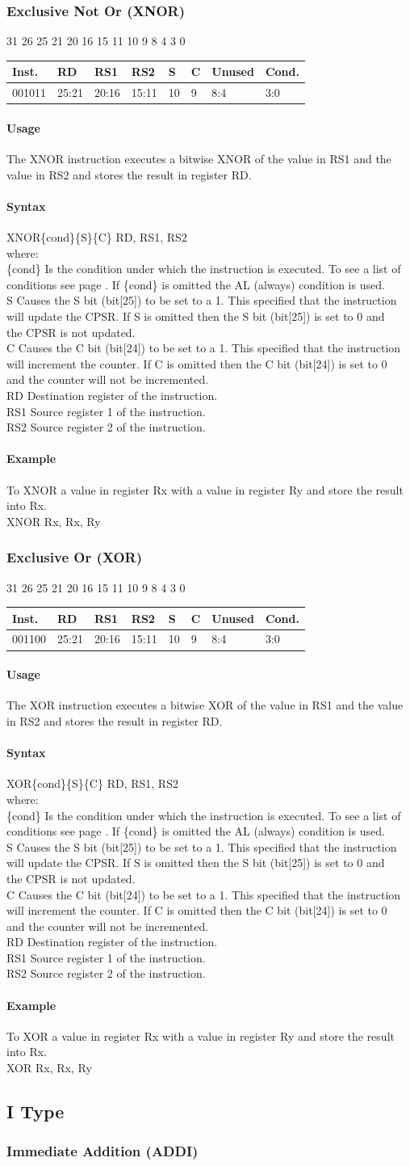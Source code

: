 \documentclass[12pt]{article}
\newcommand{\aTypeInstruction}[5]
{%
    \hspace{1.6cm}31 \hspace{1.15cm}26 \hspace{.04cm}25 \hspace{.8cm}21 \hspace{.04cm}20 \hspace{.8cm}16 \hspace{.04cm}15 \hspace{.8cm}11 \hspace{.04cm}10 \hspace{.275cm}9 \hspace{.275cm}8 \hspace{1.175cm}4 \hspace{.04cm}3 \hspace{1.25cm}0
    \vspace{-.25cm}
    \begin{center}
        \begin{tabular}{ |p{1.8cm}|p{1.5cm}|p{1.5cm}|p{1.5cm}|p{0.3cm}|p{0.3cm}|p{1.5cm}|p{1.5cm}| }
            \hline
            \textbf{Inst.} & \textbf{RD}& \textbf{RS1} & \textbf{RS2} & \textbf{S} & \textbf{C} & Unused & \textbf{Cond.}\\
            \hline
            #1 & 25:21 & 20:16 & 15:11 & 10 & 9 & 8:4 &3:0\\
            \hline
        \end{tabular}
    \end{center}
    
    \noindent
    \paragraph{Usage}
    \begin{flushleft}
    #2\\
    \end{flushleft}
    
    \paragraph{Syntax}
    \begin{flushleft}
    #3\{cond\}\{S\}\{C\} RD, RS1, RS2\\
    \vspace{1em}        %
    where:\\
    \vspace{1em}
    \{cond\}    \hspace{2em} Is the condition under which the instruction is executed. To see a list of\\
                \hspace{5.4em} conditions see page . If \{cond\} is omitted the AL (always) condition is used.\\
    \vspace{1em}    
    S       \hspace{4.5em} Causes the S bit (bit[25]) to be set to a 1. This specified that the instruction\\
            \hspace{5.4em} will update the CPSR. If S is omitted then the S bit (bit[25]) is set to 0 and\\
            \hspace{5.4em} the CPSR is not updated.\\
    \vspace{1em}    
    C       \hspace{4.5em} Causes the C bit (bit[24]) to be set to a 1. This specified that the instruction\\
            \hspace{5.4em} will increment the counter. If C is omitted then the C bit (bit[24]) is set to 0\\
            \hspace{5.4em} and the counter will not be incremented.\\
    \vspace{1em}
    RD  \hspace{3.6em} Destination register of the instruction.\\
    \vspace{1em}
    RS1  \hspace{3.35em} Source register 1 of the instruction.\\
    \vspace{1em}
    RS2  \hspace{3.35em} Source register 2 of the instruction.\\
    \end{flushleft}
    
    \paragraph{Example}
    \begin{flushleft}
    #4\\
    \vspace{1em}
    #5
    \end{flushleft}
    }
\begin{document}
        \subsubsection{Exclusive Not Or (XNOR)}
        
        \aTypeInstruction
        {001011}
        {The XNOR instruction executes a bitwise XNOR of the value in RS1 and the value in RS2 and stores the result in register RD.}
        {XNOR}
        {To XNOR a value in register Rx with a value in register Ry and store the result into Rx.}
        {XNOR Rx, Rx, Ry}
        
       
    
    
    
    
        \newpage
        \subsubsection{Exclusive Or (XOR)}
        
        \aTypeInstruction
        {001100}
        {The XOR instruction executes a bitwise XOR of the value in RS1 and the value in RS2 and stores the result in register RD.}
        {XOR}
        {To XOR a value in register Rx with a value in register Ry and store the result into Rx.}
        {XOR Rx, Rx, Ry}
        
        
       
    
    
    
    
    
    \newpage
    \subsection{I Type}
        \subsubsection{Immediate Addition (ADDI)}
        
\end{document}
